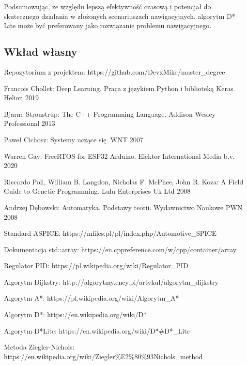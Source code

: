 \documentclass[12pt,twoside]{article}
\begin{document}
Podsumowując, ze względu lepszą efektywność czasową i potencjał do skutecznego działania w złożonych scenariuszach nawigacyjnych, algorytm D* Lite może być preferowany jako rozwiązanie problemu nawigacyjnego.

\subsection{Wkład własny}



\clearpage


\begin{thebibliography}{15}
Repozytorium z projektem: https://github.com/DevxMike/master\_degree

 Francois Chollet: Deep Learning. Praca z językiem Python i biblioteką Keras. Helion 2019

 Bjarne Stroustrup: The C++ Programming Language. Addison-Wesley Professional 2013

 Paweł Cichosz: Systemy uczące się. WNT 2007 

 Warren Gay: FreeRTOS for ESP32-Arduino. Elektor International Media b.v. 2020

  Riccardo Poli, William B. Langdon, Nicholas F. McPhee, John R. Koza: A Field Guide to Genetic Programming. Lulu Enterprises Uk Ltd 2008

 Andrzej Dębowski: Automatyka. Podstawy teorii. Wydawnictwo Naukowe PWN 2008

Standard ASPICE: https://mfiles.pl/pl/index.php/Automotive\_SPICE

Dokumentacja std::array: https://en.cppreference.com/w/cpp/container/array

Regulator PID: https://pl.wikipedia.org/wiki/Regulator\_PID

Algorytm Dijkstry: http://algorytmy.ency.pl/artykul/algorytm\_dijkstry

Algorytm A*: https://pl.wikipedia.org/wiki/Algorytm\_A*

Algorytm D*: https://en.wikipedia.org/wiki/D*

Algorytm D*Lite: https://en.wikipedia.org/wiki/D*\#D*\_Lite

Metoda Ziegler-Nichols: https://en.wikipedia.org/wiki/Ziegler\%E2\%80\%93Nichols\_method

\end{thebibliography}

\clearpage

\makesummary
\end{document}
